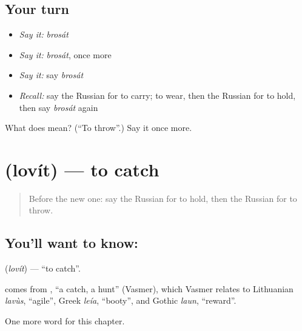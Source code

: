 \subsection*{Your turn}
\begin{itemize}
\raggedright
  \item \emph{Say it:} \emph{brosát}
  \item \emph{Say it:} \emph{brosát}, once more
  \item \emph{Say it:} say \emph{brosát}
  \item \emph{Recall:} say the Russian for to carry; to wear, then the Russian for to hold, then say \emph{brosát} again
\end{itemize}

\begin{tcolorbox}[breakable,colback=teal!4,colframe=teal!35!black,title={Before you move on}]
What does  mean? (\textquotedblleft{}To throw\textquotedblright{}.) Say it once more.
\end{tcolorbox}
\section[\texorpdfstring{\ru{ловить} (lovít)}{ловить (lovít)}]{ (lovít) — to catch}

\label{lesson:RU-C142-lovit}



\begin{quote}
Before the new one: say the Russian for to hold, then the Russian for to throw.
\end{quote}

\subsection*{You'll want to know: }
\textbf{} (\emph{lovít}) — \textquotedblleft{}to catch\textquotedblright{}.

\begin{cousinweb}
\textbf{} comes from \emph{}, \textquotedblleft{}a catch, a hunt\textquotedblright{} (Vasmer), which Vasmer relates to Lithuanian \emph{lavùs}, \textquotedblleft{}agile\textquotedblright{}, Greek \emph{leía}, \textquotedblleft{}booty\textquotedblright{}, and Gothic \emph{laun}, \textquotedblleft{}reward\textquotedblright{}.
\end{cousinweb}

\begin{grammarlens}[title={What you've built}]
One more word for this chapter.
\end{grammarlens}

